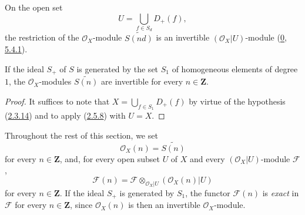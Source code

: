\begin{corollary}[2.5.8]
\label{II.2.5.8}
On the open set
\[
  U=\bigcup_{f\in S_d}D_+(f),
\]
the restriction of the $\mathcal{O}_X$-module $\widetilde{S(nd)}$ is an
invertible $(\mathcal{O}_X|U)$-module
(\hyperref[0.5.4.1]{0, 5.4.1}).
\end{corollary}

\begin{corollary}[2.5.9]
\label{II.2.5.9}
If the ideal $S_+$ of $S$ is generated by the set $S_1$ of homogeneous
elements of degree $1$, the $\mathcal{O}_X$-modules
$\widetilde{S(n)}$ are invertible for every $n\in\mathbf{Z}$.
\end{corollary}

\begin{proof}
It suffices to note that
$X=\bigcup_{f\in S_1}D_+(f)$ by virtue of the hypothesis
(\hyperref[II.2.3.14]{2.3.14}) and to apply
(\hyperref[II.2.5.8]{2.5.8}) with $U=X$.
\end{proof}

\begin{env}[2.5.10]
\label{II.2.5.10}
Throughout the rest of this section, we set
\[
\label{II.2.5.10.1}
  \mathcal{O}_X(n)=\widetilde{S(n)}
\tag{2.5.10.1}
\]
for every $n\in\mathbf{Z}$, and, for every open subset $U$ of $X$ and every
$(\mathcal{O}_X|U)$-module $\mathcal{F}$,
\[
\label{II.2.5.10.2}
  \mathcal{F}(n)=
  \mathcal{F}\otimes_{\mathcal{O}_X|U}(\mathcal{O}_X(n)|U)
\tag{2.5.10.2}
\]
for every $n\in\mathbf{Z}$. If the ideal $S_+$ is generated by $S_1$, the
functor $\mathcal{F}(n)$ is \emph{exact} in
$\mathcal{F}$ for every $n\in\mathbf{Z}$, since $\mathcal{O}_X(n)$ is then
an invertible $\mathcal{O}_X$-module.
\end{env}

